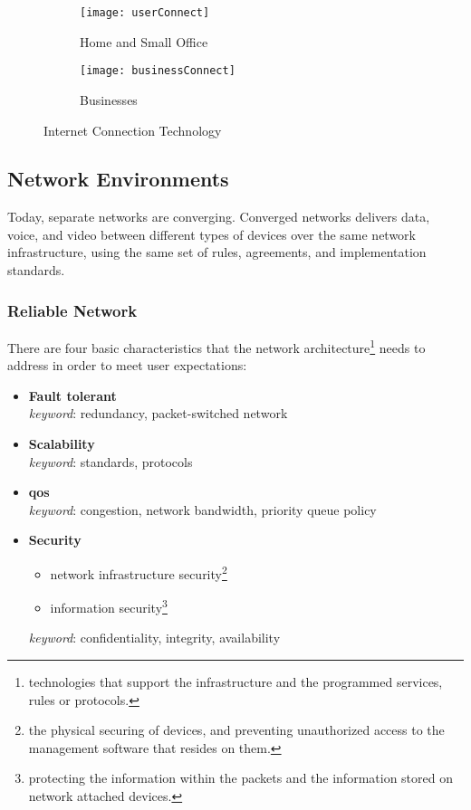 \documentclass[crop=false]{standalone}
\begin{document}
\begin{figure}[ht]
    \centering
    \begin{subfigure}{.5\textwidth}
      \centering
      \texttt{[image: userConnect]}
      \caption{Home and Small Office}
      \label{fig:Home and Small Office Internet Connections}
      \end{subfigure}%
    \begin{subfigure}{.5\textwidth}
      \centering
      \texttt{[image: businessConnect]}
      \caption{Businesses}
      \label{fig:Businesses Internet Connections}
    \end{subfigure}
    \caption{Internet Connection Technology}
    \label{fig:Internet Connection Technology}
\end{figure}

\subsection{Network Environments}
Today, separate networks are converging. Converged networks delivers data, voice, and video between different types of devices over the same network infrastructure, using the same set of rules, agreements, and implementation standards.
\subsubsection{Reliable Network}
There are four basic characteristics that the network architecture\footnote{technologies that support the infrastructure and the programmed services, rules or protocols.} needs to address in order to meet user expectations:
\begin{itemize}
  \item \textbf{Fault tolerant}\\\textit{keyword}: redundancy, packet-switched network
  \item \textbf{Scalability}\\\textit{keyword}: standards, protocols
  \item \textbf{\acrfull{qos}}\\\textit{keyword}: congestion, network bandwidth, priority queue policy
  \item \textbf{Security}
    \begin{itemize}
      \item network infrastructure security\footnote{the physical securing of devices, and preventing unauthorized access to the management software that resides on them.}
      \item information security\footnote{protecting the information within the packets and the information stored on network attached devices.}
    \end{itemize}
    \textit{keyword}: confidentiality, integrity, availability
\end{itemize}
\end{document}
